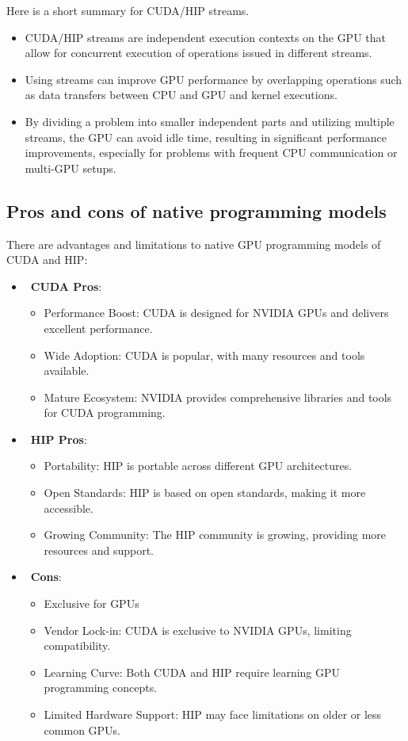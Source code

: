 \par
Here is a short summary for CUDA/HIP streams.
\begin{itemize}
    \item CUDA/HIP streams are independent execution contexts on the GPU that allow for concurrent execution of operations issued in different streams.
    \item Using streams can improve GPU performance by overlapping operations such as data transfers between CPU and GPU and kernel executions.
    \item By dividing a problem into smaller independent parts and utilizing multiple streams, the GPU can avoid idle time, resulting in significant performance improvements, especially for problems with frequent CPU communication or multi-GPU setups.
\end{itemize}




\subsection{Pros and cons of native programming models}


\par
There are advantages and limitations to native GPU programming models of CUDA and HIP:
\begin{itemize}
    \item~\textbf{CUDA Pros}:
    \begin{itemize}
        \item Performance Boost: CUDA is designed for NVIDIA GPUs and delivers excellent performance.
        \item Wide Adoption: CUDA is popular, with many resources and tools available.
        \item Mature Ecosystem: NVIDIA provides comprehensive libraries and tools for CUDA programming.
    \end{itemize}
    \item~\textbf{HIP Pros}:
    \begin{itemize}
        \item Portability: HIP is portable across different GPU architectures.
        \item Open Standards: HIP is based on open standards, making it more accessible.
        \item Growing Community: The HIP community is growing, providing more resources and support.
    \end{itemize}
    \item~\textbf{Cons}:
    \begin{itemize}
        \item Exclusive for GPUs
        \item Vendor Lock-in: CUDA is exclusive to NVIDIA GPUs, limiting compatibility.
        \item Learning Curve: Both CUDA and HIP require learning GPU programming concepts.
        \item Limited Hardware Support: HIP may face limitations on older or less common GPUs.
    \end{itemize}
\end{itemize}

